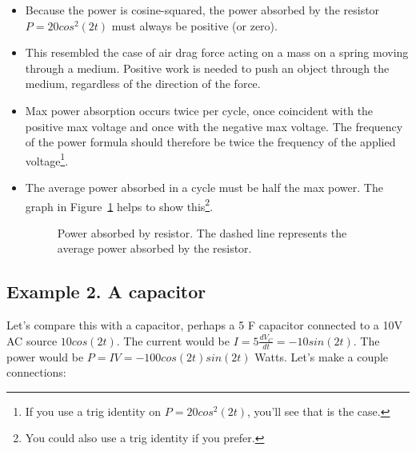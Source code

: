 \documentclass{book}
\numberwithin{equation}{section}
\theoremstyle{definition}
\begin{document}
\begin{itemize}
\item Because the power is cosine-squared, the power absorbed by the resistor $P=20cos^2(2t)$ must always be positive (or zero).
\item This resembled the case of air drag force acting on a mass on a spring moving through a medium. Positive work is needed to push an object through the medium, regardless of the direction of the force.
\item Max power absorption occurs twice per cycle, once coincident with the positive max voltage and once with the negative max voltage. The frequency of the power formula should therefore be twice the frequency of the applied voltage\footnote{If you use a trig identity on $P=20cos^2(2t)$, you'll see that is the case.}.
\item The average power absorbed in a cycle must be half the max power.  The graph in Figure~\ref{F:8POW} helps to show this\footnote{You could also use a trig identity if you prefer.}.

\begin{figure}[H]
\begin{center}
\caption{Power absorbed by resistor. The dashed line represents the average power absorbed by the resistor.}
\end{center}
\label{F:8POW}
\end{figure}

\end{itemize}

\subsection{Example 2. A capacitor}
Let's compare this with a capacitor, perhaps a 5 F capacitor connected to a 10V AC source $10cos(2t)$. The current would be $I=5\frac{dV_C}{dt}=-10sin(2t)$. The power would be $P=IV=-100cos(2t)sin(2t)$ Watts. Let's make a couple connections:
\end{document}
